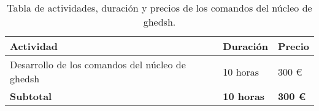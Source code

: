 \begin{table}[!ht]
\begin{center}
\begin{tabular}{|p{80mm}|p{25mm}|p{20mm}|} \hline 
\textbf{Actividad} & \textbf{Duración} & \textbf{Precio} \\ \hline

Desarrollo de los comandos del núcleo de ghedsh &
10 horas &
300 \euro{}
\\
\hline
\hline \hline
{\bfseries Subtotal} &
{\bfseries 10 horas} &
{\bfseries 300 \euro{}}
\\
\hline

\end{tabular}
\end{center}
\caption{Tabla de actividades, duración y precios de los comandos del núcleo de ghedsh.}
\label{table:resOthers1}
\end{table}


